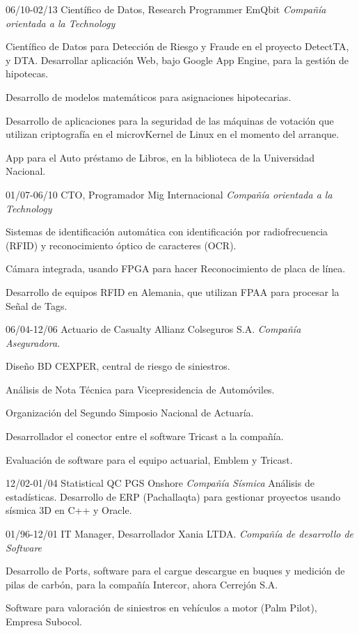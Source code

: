 \begin{entrylist}


  \entry
	{06/10-02/13}
	{Científico de Datos, Research Programmer}
	{EmQbit {\sl Compañía orientada a la Technology}}
	{Científico de Datos para Detección de Riesgo y Fraude en el proyecto DetectTA, y DTA.
Desarrollar aplicación Web, bajo Google App Engine, para la gestión de hipotecas.

Desarrollo de modelos matemáticos para asignaciones hipotecarias.

Desarrollo de aplicaciones para la seguridad de las máquinas de votación que utilizan criptografía
en el microvKernel de Linux en el momento del arranque.

App para el Auto préstamo de Libros, en la biblioteca de la Universidad Nacional.}

  \entry
	{01/07-06/10}
	{CTO, Programador}
	{Mig Internacional {\sl Compañía orientada a la Technology}}
	{Sistemas de identificación automática con identificación por radiofrecuencia (RFID)
y reconocimiento óptico de caracteres (OCR).

Cámara integrada, usando FPGA para hacer Reconocimiento de placa de línea.

Desarrollo de equipos RFID en Alemania, que utilizan FPAA para procesar la
Señal de Tags.}

  \entry
	{06/04-12/06}
	{Actuario de Casualty}
	{Allianz Colseguros S.A. {\sl Compañía Aseguradora.}}
	{Diseño BD CEXPER, central de riesgo de siniestros.

Análisis de Nota Técnica para Vicepresidencia de Automóviles.

Organización del Segundo Simposio Nacional de Actuaría.

Desarrollador el conector entre el software Tricast a la compañía.

Evaluación de software para el equipo actuarial, Emblem y Tricast.}


  \entry
	{12/02-01/04}
	{Statistical QC}
	{PGS Onshore {\sl Compañía Sísmica}}
	{Análisis de estadísticas. Desarrollo de ERP (Pachallaqta) para gestionar proyectos
	usando sísmica 3D en C++ y Oracle.}

  \entry
	{01/96-12/01}
	{IT Manager, Desarrollador}
	{Xania LTDA. {\sl Compañía de desarrollo de Software}}
	{Desarrollo de Ports, software para el cargue descargue en buques y medición de pilas de carbón,
	para la compañía Intercor, ahora Cerrejón S.A.

Software para valoración de siniestros en vehículos a motor (Palm Pilot), Empresa
Subocol.

}
\end{entrylist}
